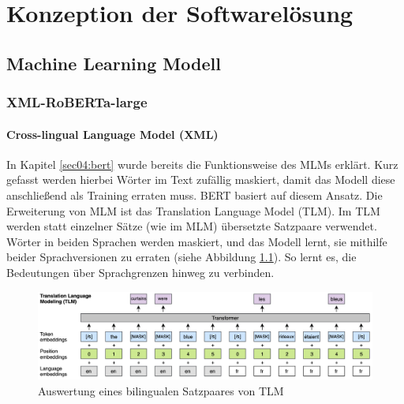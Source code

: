 \chapter{Konzeption der Softwarelösung}
\label{chap:konzeption_der_softwareloesung}

\section{Machine Learning Modell} \label{sec:06:machine_learning_model}

\subsection{XML-RoBERTa-large}


\subsubsection{Cross-lingual Language Model (XML)}

In Kapitel \ref{sec04:bert} wurde bereits die Funktionsweise des MLMs erklärt. Kurz gefasst werden hierbei Wörter im Text zufällig maskiert, damit das Modell 
diese anschließend als Training erraten muss. BERT basiert auf diesem Ansatz. Die Erweiterung von MLM ist das Translation Language Model (TLM).
Im TLM werden statt einzelner Sätze (wie im MLM) übersetzte Satzpaare verwendet. Wörter in beiden Sprachen werden maskiert, und das Modell lernt, 
sie mithilfe beider Sprachversionen zu erraten (siehe Abbildung \ref{fig:translation_language_modeling}). So lernt es, die Bedeutungen über Sprachgrenzen hinweg zu 
verbinden.

\begin{figure}[htbp]
    \begin{center}
    \includegraphics[scale=0.32]{static/translation_language_modeling.png}
    \caption{\label{fig:translation_language_modeling} Auswertung eines bilingualen Satzpaares von TLM \cite{NEURIPS2019_c04c19c2}}
    \end{center}
\end{figure}


